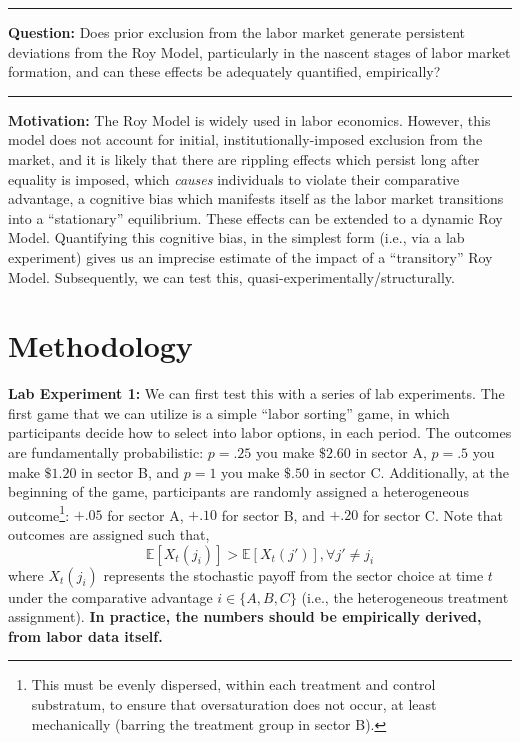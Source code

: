 \documentclass[17pt]{extarticle}  %
\begin{document}
\noindent\rule{\linewidth}{0.4pt}

\noindent\textbf{Question:}
Does prior exclusion from the labor market generate persistent deviations from the Roy Model, particularly in the nascent stages of labor market formation, and can these effects be adequately quantified, empirically? 

\noindent\rule{\linewidth}{0.4pt}


\noindent\textbf{Motivation:}
The Roy Model is widely used in labor economics. However, this model does not account for initial, institutionally-imposed exclusion from the market, and it is likely that there are rippling effects which persist long after equality is imposed, which \emph{causes} individuals to violate their comparative advantage, a cognitive bias which manifests itself as the labor market transitions into a \enquote{stationary} equilibrium. These effects can be extended to a dynamic Roy Model. Quantifying this cognitive bias, in the simplest form (i.e., via a lab experiment) gives us an imprecise estimate of the impact of a \enquote{transitory} Roy Model. Subsequently, we can test this, quasi-experimentally/structurally.



\newpage

\section{Methodology}

\noindent\textbf{Lab Experiment 1:} 
We can first test this with a series of lab experiments. The first game that we can utilize is a simple \enquote{labor sorting} game, in which participants decide how to select into labor options, in each period. The outcomes are fundamentally probabilistic: $p = .25$ you make $\$2.60$ in sector A, $p=.5$ you make $\$1.20$ in sector B, and $p = 1$ you make $\$.50$ in sector C. Additionally, at the beginning of the game, participants are randomly assigned a heterogeneous outcome\footnote{This must be evenly dispersed, within each treatment and control substratum, to ensure that oversaturation does not occur, at least mechanically (barring the treatment group in sector B).}: $+.05$ for sector A, $+.10$ for sector B, and $+.20$ for sector C. Note that outcomes are assigned such that,
\[
\mathbb{E}[X_t(j_i)] > \mathbb{E}[X_t(j')], \forall j' \neq j_i
\]
where $X_t(j_i)$ represents the stochastic payoff from the sector choice at time $t$ under the comparative advantage $i \in \{A,B,C\}$ (i.e., the heterogeneous treatment assignment). \textbf{In practice, the numbers should be empirically derived, from labor data itself.}
\end{document}
